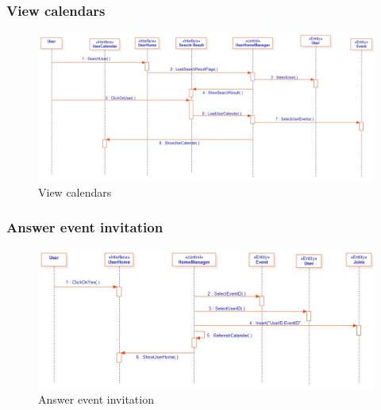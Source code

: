 \subsubsection{View calendars}
\begin{figure}[tbh]
  \begin{center}
  \includegraphics[width=150mm]{8view}
    \caption{View calendars}\label{Fig 1:}
  \end{center}
\end{figure}
\newpage
\subsubsection{Answer event invitation}
\begin{figure}[tbh]
  \begin{center}
  \includegraphics[width=150mm]{9answereventInvitation}
    \caption{Answer event invitation}\label{Fig 1:}
  \end{center}
\end{figure}
